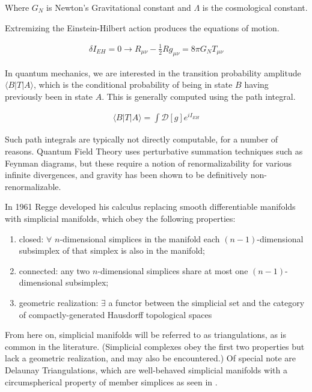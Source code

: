 \documentclass[12pt]{article}
\begin{document}
Where $G_{N}$ is Newton's Gravitational constant and $\Lambda$ is the cosmological constant.

Extremizing the Einstein-Hilbert action produces the equations of motion.

\begin{align}
  \delta I_{EH} = 0 \rightarrow R_{\mu\nu}-\frac{1}{2}Rg_{\mu\nu}=8\pi G_{N}T_{\mu\nu}
\end{align}

In quantum mechanics, we are interested in the transition probability amplitude $\langle B|T|A\rangle$, which is the conditional probability of being in state $B$ having previously
been in state $A$. This is generally computed using the path integral.

\begin{align}
  \langle B|T|A\rangle=\int\mathcal{D}[g]e^{iI_{EH}}
\end{align}

Such path integrals are typically not directly computable, for a number of reasons. Quantum Field Theory uses perturbative summation techniques such as Feynman diagrams, but these require a notion of renormalizability for various infinite divergences, and gravity has been shown to be definitively non-renormalizable.\cite{shomer_pedagogical_2007}

In 1961 Regge developed his calculus replacing smooth differentiable manifolds with simplicial manifolds, which obey the following properties:\\[-4ex]
\begin{enumerate}\addtolength{\itemsep}{-1.5ex}
\item closed: $\forall$ $n$-dimensional simplices in the manifold each $(n-1)$-dimensional subsimplex of that simplex is also in the manifold;  
\item connected: any two $n$-dimensional simplices share at most one $(n-1)$-dimensional subsimplex;
\item geometric realization: $\exists$ a functor between the simplicial set and the category of compactly-generated Hausdorff topological spaces
\end{enumerate}
\vspace*{-1ex}

From here on, simplicial manifolds will be referred to as triangulations, as is common in the literature. (Simplicial complexes obey the first two
properties but lack a geometric realization, and may also be encountered.) Of special note are Delaunay Triangulations, which are well-behaved simplicial
manifolds with a circumspherical property of member simplices as seen in .
\end{document}
